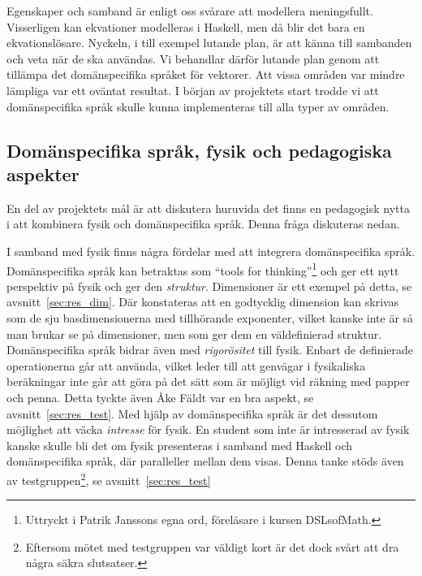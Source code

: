 Egenskaper och samband är enligt oss svårare att modellera meningsfullt. Visserligen kan ekvationer modelleras i Haskell, men då blir det bara en ekvationslösare. Nyckeln, i till exempel lutande plan, är att känna till sambanden och veta när de ska användas. Vi behandlar därför lutande plan genom att tillämpa det domänspecifika språket för vektorer. Att vissa områden var mindre lämpliga var ett oväntat resultat. I början av projektets start trodde vi att domänspecifika språk skulle kunna implementeras till alla typer av områden.

\subsection{Domänspecifika språk, fysik och pedagogiska aspekter}\label{sec:bara_fysik}

En del av projektets mål är att diskutera huruvida det finns en pedagogisk nytta i att kombinera fysik och domänspecifika språk. Denna fråga diskuteras nedan.

I samband med fysik finns några fördelar med att integrera domänspecifika språk. Domänspecifika språk kan betraktas som ``tools for thinking''\footnote{Uttryckt i Patrik Janssons egna ord, föreläsare i kursen DSLsofMath.} och ger ett nytt perspektiv på fysik och ger den \textit{struktur}. Dimensioner är ett exempel på detta, se avsnitt~\ref{sec:res_dim}. Där konstateras att en godtycklig dimension kan skrivas som de sju basdimensionerna med tillhörande exponenter, vilket kanske inte är så man brukar se på dimensioner, men som ger dem en väldefinierad struktur. Domänspecifika språk bidrar även med \textit{rigorösitet} till fysik. Enbart de definierade operationerna går att använda, vilket leder till att genvägar i fysikaliska beräkningar inte går att göra på det sätt som är möjligt vid räkning med papper och penna. Detta tyckte även Åke Fäldt var en bra aspekt, se avsnitt~\ref{sec:res_test}. Med hjälp av domänspecifika språk är det dessutom möjlighet att väcka \textit{intresse} för fysik. En student som inte är intresserad av fysik kanske skulle bli det om fysik presenteras i samband med Haskell och domänspecifika språk, där paralleller mellan dem visas. Denna tanke stöds även av testgruppen\footnote{Eftersom mötet med testgruppen var väldigt kort är det dock svårt att dra några säkra slutsatser.}, se avsnitt~\ref{sec:res_test}

